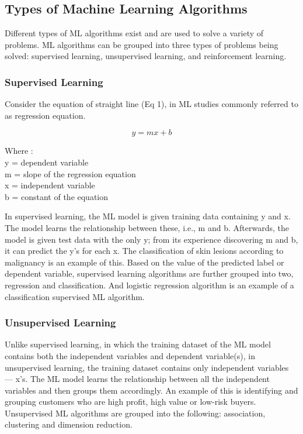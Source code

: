\documentclass[conference]{IEEEtran}
\begin{document}
\subsection{Types of Machine Learning Algorithms}
Different types of ML algorithms exist and are used to solve a variety of problems. ML algorithms can be grouped into three types of problems being solved: supervised learning, unsupervised learning, and reinforcement learning.

\subsubsection{Supervised Learning}
Consider the equation of straight line (Eq 1), in ML studies commonly referred to as regression equation.
               
\begin{equation} 
\label{equ1}
y = mx+b 
\end{equation} 

Where :\\
y = dependent variable \\
m = slope of the regression equation\\
x = independent variable\\
b = constant of the equation

In supervised learning, the ML model is given training data containing y and x. The model learns the relationship between these, i.e., m and b. Afterwards, the model is given test data with the only y; from its experience discovering m and b, it can predict the y's for each x. The classification of skin lesions according to malignancy is an example of this\cite{bb3}. Based on the value of the predicted label or dependent variable, supervised learning algorithms are further grouped into two, regression and classification. And logistic regression algorithm is an example of a classification supervised ML algorithm.\\

\subsubsection{Unsupervised Learning}
Unlike supervised learning, in which the training dataset of the ML model contains both the independent variables and dependent variable(s), in unsupervised learning, the training dataset contains only independent variables — x's. The ML model learns the relationship between all the independent variables and then groups them accordingly. An example of this is identifying and grouping customers who are high profit, high value or low-risk buyers\cite{bb4}. Unsupervised ML algorithms are grouped into the following: association, clustering and dimension reduction.
\end{document}
